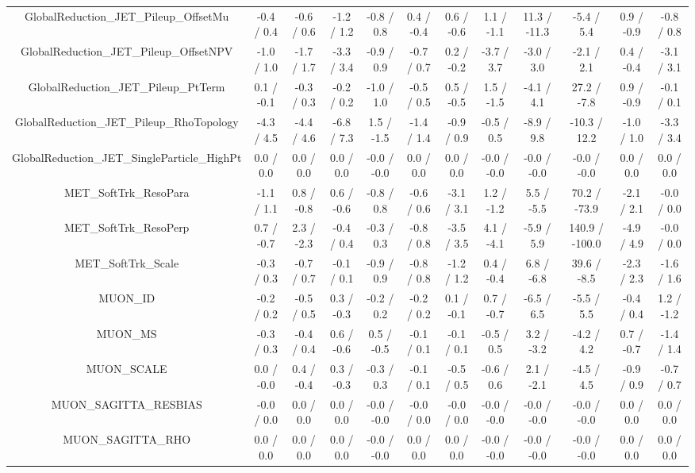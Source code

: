 \begin{table}[htbp]
\begin{center}
\begin{tabular}{|c|c|c|c|c|c|c|c|c|c|c|c|}
  GlobalReduction_JET_Pileup_OffsetMu & -0.4 / 0.4 & -0.6 / 0.6 & -1.2 / 1.2 & -0.8 / 0.8 & 0.4 / -0.4 & 0.6 / -0.6 & 1.1 / -1.1 & 11.3 / -11.3 & -5.4 / 5.4 & 0.9 / -0.9 & -0.8 / 0.8 \\ 
  GlobalReduction_JET_Pileup_OffsetNPV & -1.0 / 1.0 & -1.7 / 1.7 & -3.3 / 3.4 & -0.9 / 0.9 & -0.7 / 0.7 & 0.2 / -0.2 & -3.7 / 3.7 & -3.0 / 3.0 & -2.1 / 2.1 & 0.4 / -0.4 & -3.1 / 3.1 \\ 
  GlobalReduction_JET_Pileup_PtTerm & 0.1 / -0.1 & -0.3 / 0.3 & -0.2 / 0.2 & -1.0 / 1.0 & -0.5 / 0.5 & 0.5 / -0.5 & 1.5 / -1.5 & -4.1 / 4.1 & 27.2 / -7.8 & 0.9 / -0.9 & -0.1 / 0.1 \\ 
  GlobalReduction_JET_Pileup_RhoTopology & -4.3 / 4.5 & -4.4 / 4.6 & -6.8 / 7.3 & 1.5 / -1.5 & -1.4 / 1.4 & -0.9 / 0.9 & -0.5 / 0.5 & -8.9 / 9.8 & -10.3 / 12.2 & -1.0 / 1.0 & -3.3 / 3.4 \\ 
  GlobalReduction_JET_SingleParticle_HighPt & 0.0 / 0.0 & 0.0 / 0.0 & 0.0 / 0.0 & -0.0 / -0.0 & 0.0 / 0.0 & 0.0 / 0.0 & -0.0 / -0.0 & -0.0 / -0.0 & -0.0 / -0.0 & 0.0 / 0.0 & 0.0 / 0.0 \\ 
  MET_SoftTrk_ResoPara & -1.1 / 1.1 & 0.8 / -0.8 & 0.6 / -0.6 & -0.8 / 0.8 & -0.6 / 0.6 & -3.1 / 3.1 & 1.2 / -1.2 & 5.5 / -5.5 & 70.2 / -73.9 & -2.1 / 2.1 & -0.0 / 0.0 \\ 
  MET_SoftTrk_ResoPerp & 0.7 / -0.7 & 2.3 / -2.3 & -0.4 / 0.4 & -0.3 / 0.3 & -0.8 / 0.8 & -3.5 / 3.5 & 4.1 / -4.1 & -5.9 / 5.9 & 140.9 / -100.0 & -4.9 / 4.9 & -0.0 / 0.0 \\ 
  MET_SoftTrk_Scale & -0.3 / 0.3 & -0.7 / 0.7 & -0.1 / 0.1 & -0.9 / 0.9 & -0.8 / 0.8 & -1.2 / 1.2 & 0.4 / -0.4 & 6.8 / -6.8 & 39.6 / -8.5 & -2.3 / 2.3 & -1.6 / 1.6 \\ 
  MUON_ID & -0.2 / 0.2 & -0.5 / 0.5 & 0.3 / -0.3 & -0.2 / 0.2 & -0.2 / 0.2 & 0.1 / -0.1 & 0.7 / -0.7 & -6.5 / 6.5 & -5.5 / 5.5 & -0.4 / 0.4 & 1.2 / -1.2 \\ 
  MUON_MS & -0.3 / 0.3 & -0.4 / 0.4 & 0.6 / -0.6 & 0.5 / -0.5 & -0.1 / 0.1 & -0.1 / 0.1 & -0.5 / 0.5 & 3.2 / -3.2 & -4.2 / 4.2 & 0.7 / -0.7 & -1.4 / 1.4 \\ 
  MUON_SCALE & 0.0 / -0.0 & 0.4 / -0.4 & 0.3 / -0.3 & -0.3 / 0.3 & -0.1 / 0.1 & -0.5 / 0.5 & -0.6 / 0.6 & 2.1 / -2.1 & -4.5 / 4.5 & -0.9 / 0.9 & -0.7 / 0.7 \\ 
  MUON_SAGITTA_RESBIAS & -0.0 / 0.0 & 0.0 / 0.0 & 0.0 / 0.0 & -0.0 / -0.0 & -0.0 / 0.0 & -0.0 / 0.0 & -0.0 / -0.0 & -0.0 / -0.0 & -0.0 / -0.0 & 0.0 / 0.0 & 0.0 / 0.0 \\ 
  MUON_SAGITTA_RHO & 0.0 / 0.0 & 0.0 / 0.0 & 0.0 / 0.0 & -0.0 / -0.0 & 0.0 / 0.0 & 0.0 / 0.0 & -0.0 / -0.0 & -0.0 / -0.0 & -0.0 / -0.0 & 0.0 / 0.0 & 0.0 / 0.0 \\ 

\end{tabular}
\end{center}
\end{table}
